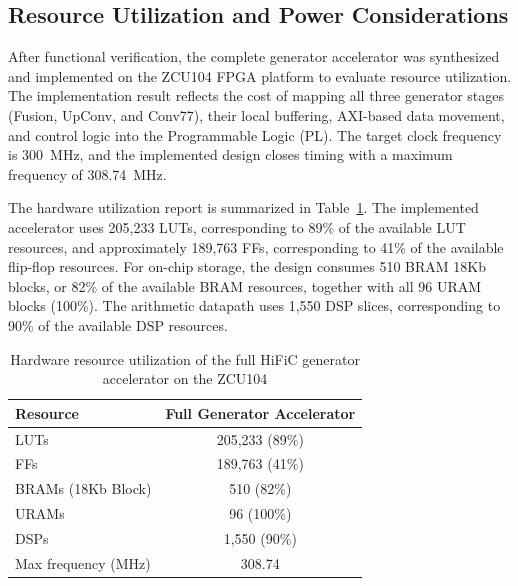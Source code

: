 
\subsection{Resource Utilization and Power Considerations}

After functional verification, the complete generator accelerator was synthesized and implemented on the ZCU104 FPGA platform to evaluate resource utilization. The implementation result reflects the cost of mapping all three generator stages (Fusion, UpConv, and Conv77), their local buffering, AXI-based data movement, and control logic into the Programmable Logic (PL). The target clock frequency is 300~MHz, and the implemented design closes timing with a maximum frequency of 308.74~MHz.

The hardware utilization report is summarized in Table~\ref{tab:hific_generator_utilization}. The implemented accelerator uses 205,233 LUTs, corresponding to 89\% of the available LUT resources, and approximately 189,763 FFs, corresponding to 41\% of the available flip-flop resources. For on-chip storage, the design consumes 510 BRAM 18Kb blocks, or 82\% of the available BRAM resources, together with all 96 URAM blocks (100\%). The arithmetic datapath uses 1,550 DSP slices, corresponding to 90\% of the available DSP resources.

\begin{table}[H]
    \centering
    \caption{Hardware resource utilization of the full HiFiC generator accelerator on the ZCU104}
    \label{tab:hific_generator_utilization}
    \begin{tabular}{|l|c|}
        \hline
        \textbf{Resource} & \textbf{Full Generator Accelerator} \\
        \hline
        LUTs & 205,233 (89\%) \\
        \hline
        FFs & 189,763 (41\%) \\
        \hline
        BRAMs (18Kb Block) & 510 (82\%) \\
        \hline
        URAMs & 96 (100\%) \\
        \hline
        DSPs & 1,550 (90\%) \\
        \hline
        Max frequency (MHz) & 308.74 \\
        \hline
    \end{tabular}
\end{table}

